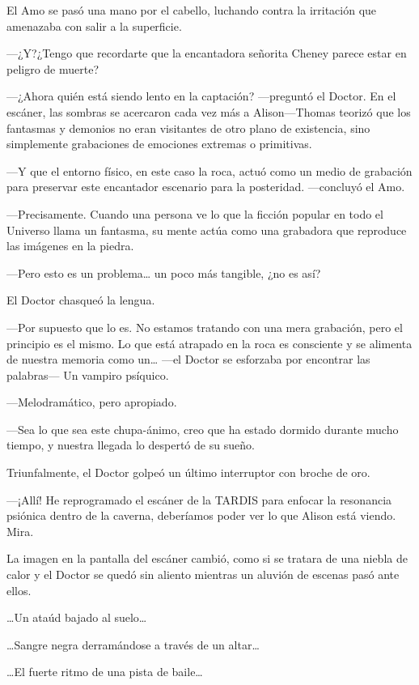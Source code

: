 {El Amo se pasó una mano por el cabello, luchando contra la irritación
que amenazaba con salir a la superficie.}

{---¿Y?\@ ¿Tengo que recordarte que la encantadora señorita Cheney parece
estar en peligro de muerte?}

{---¿Ahora quién está siendo lento en la captación? ---preguntó el
 Doctor. En el escáner, las sombras se acercaron cada vez más a
 Alison---Thomas teorizó que los fantasmas y demonios no eran visitantes
 de otro plano de existencia, sino simplemente grabaciones de emociones
extremas o primitivas.}

{---Y que el entorno físico, en este caso la roca, actuó como un medio de
 grabación para preservar este encantador escenario para la posteridad.
---concluyó el Amo.}

{---Precisamente. Cuando una persona ve lo que la ficción popular en todo
 el Universo llama un fantasma, su mente actúa como una grabadora que
reproduce las imágenes en la piedra.}

{---Pero esto es un problema\ldots{} un poco más tangible, ¿no es así?}

{El Doctor chasqueó la lengua.}

{---Por supuesto que lo es. No estamos tratando con una mera grabación,
 pero el principio es el mismo. Lo que está atrapado en la roca es
 consciente y se alimenta de nuestra memoria como un\ldots{} ---el Doctor
se esforzaba por encontrar las palabras--- Un vampiro psíquico.}

{---Melodramático, pero apropiado.}

{---Sea lo que sea este chupa-ánimo, creo que ha estado dormido durante
mucho tiempo, y nuestra llegada lo despertó de su sueño.}

{Triunfalmente, el Doctor golpeó un último interruptor con broche de
oro.}

{---¡Allí! He reprogramado el escáner de la TARDIS para enfocar la
 resonancia psiónica dentro de la caverna, deberíamos poder ver lo que
Alison está viendo. Mira.}

{La imagen en la pantalla del escáner cambió, como si se tratara de una
 niebla de calor y el Doctor se quedó sin aliento mientras un aluvión de
escenas pasó ante ellos.}

{\ldots{}Un ataúd bajado al suelo\ldots{}}

{\ldots{}Sangre negra derramándose a través de un altar\ldots{}}

{\ldots{}El fuerte ritmo de una pista de baile\ldots{}}

